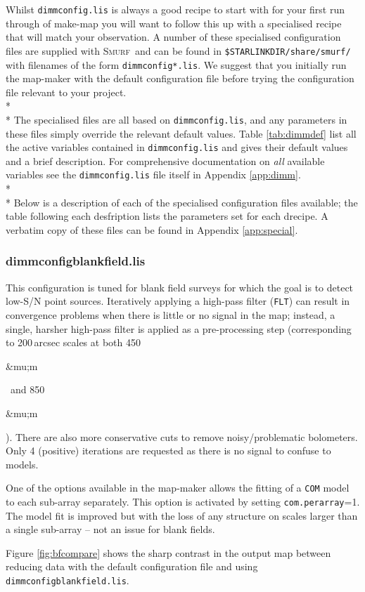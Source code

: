 \documentclass[twoside,11pt]{article}
\newcommand{\micron}{\mbox{\,${\umu}$m}}            %
\newcounter{box}
\newcommand{\xref}[3]{#1}
\renewcommand{\_}{\texttt{\symbol{95}}}
\newcommand{\smurf}{\xref{\textsc{Smurf}}{sun258}{}}
\renewcommand{\micron}{\begin{rawhtml}&mu;m\end{rawhtml}}
\begin{document}
Whilst \texttt{dimmconfig.lis} is always a good recipe to start with for your first run through of make-map you will want to follow this up with a specialised recipe that will match your observation. A number of these specialised configuration files are supplied with \smurf\ and can be found in \texttt{\$STARLINK\_DIR/share/smurf/} with filenames of the form \texttt{dimmconfig*.lis}. We suggest that you initially run the map-maker with the default configuration file before trying the configuration file relevant to your project.
\\*\\*
The specialised files are all based on \texttt{dimmconfig.lis}, and any parameters in these files simply override the relevant default values.  Table \ref{tab:dimmdef} list all the active variables contained in \texttt{dimmconfig.lis} and gives their default values and a brief description. For comprehensive documentation on \emph{all} available variables see the  \texttt{dimmconfig.lis} file itself in  Appendix \ref{app:dimm}.
\\*\\*
Below is a description of each of the specialised configuration files available; the table following each desfription lists the parameters set for each drecipe. A verbatim copy of these files can be found in Appendix \ref{app:special}.

\subsubsection{dimmconfig\_blank\_field.lis}
 This configuration is tuned for blank field surveys for which the goal is to detect low-S/N point sources. Iteratively applying a high-pass filter (\texttt{FLT}) can result in convergence problems when there  is little or no signal in the map; instead, a single, harsher high-pass filter is  applied as a pre-processing step (corresponding to 200\,arcsec  scales at both 450\micron\ and 850\micron). There are also more  conservative cuts to remove noisy/problematic bolometers. Only 4 (positive) iterations are requested as there is no signal to confuse to models. 

One of the options available in the map-maker allows the fitting of a \texttt{COM} model to each sub-array separately. This option is activated by setting  \texttt{com.perarray}=1. The model fit is improved but with the loss of any structure on scales larger than a single sub-array -- not an issue for blank fields.

Figure \ref{fig:bfcompare} shows the sharp contrast in the output map between reducing data with the default configuration file and using \texttt{dimmconfig\_blank\_field.lis}.
\end{document}
